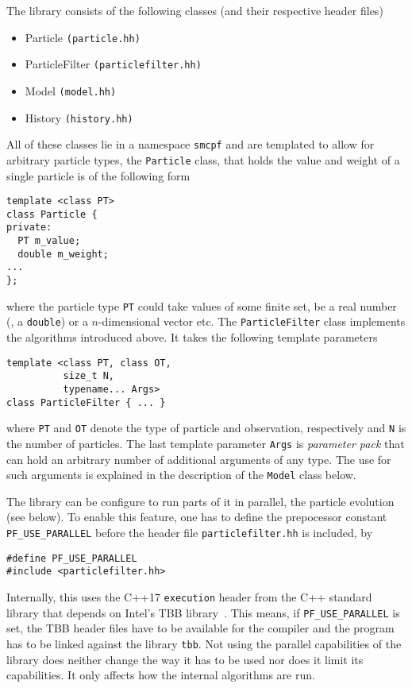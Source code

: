 The library consists of the following classes (and their respective
header files)
\begin{itemize}
\item Particle \texttt{(particle.hh)}
\item ParticleFilter \texttt{(particlefilter.hh)}
\item Model \texttt{(model.hh)}
\item History \texttt{(history.hh)}
\end{itemize}
All of these classes lie in a namespace \texttt{smcpf} and are
templated to allow for arbitrary particle types, \eg the
\texttt{Particle} class, that holds the value and weight of a single
particle is of the following form
\begin{verbatim}
template <class PT> 
class Particle {
private:
  PT m_value;
  double m_weight;
...
}; 
\end{verbatim}
where the particle type \texttt{PT} could take values of some finite
set, be a real number (\ie, a \texttt{double}) or a $n$-dimensional
vector etc. The \texttt{ParticleFilter} class implements the
algorithms introduced above. It takes the following template
parameters
\begin{verbatim}
template <class PT, class OT, 
          size_t N,  
          typename... Args>
class ParticleFilter { ... }

\end{verbatim}
where \texttt{PT} and \texttt{OT} denote the type of particle and
observation, respectively and \texttt{N} is the number of
particles. The last template parameter \texttt{Args} is
\emph{parameter pack} that can hold an arbitrary number of additional
arguments of any type. The use for such arguments is explained in the
description of the \texttt{Model} class below.

The library can be configure to run parts of it in parallel, \eg the
particle evolution (see below). To enable this feature, one has to
define the prepocessor constant \texttt{PF\_USE\_PARALLEL} before the
header file \texttt{particlefilter.hh} is included, \eg by
\begin{verbatim}
#define PF_USE_PARALLEL
#include <particlefilter.hh>
\end{verbatim}

Internally, this uses the C++17 \texttt{execution} header from the C++
standard library that depends on Intel's TBB
library~\cite{intel}. This means, if \texttt{PF\_USE\_PARALLEL} is
set, the TBB header files have to be available for the compiler and
the program has to be linked against the library \texttt{tbb}. Not
using the parallel capabilities of the library does neither change the
way it has to be used nor does it limit its capabilities. It only
affects how the internal algorithms are run.

